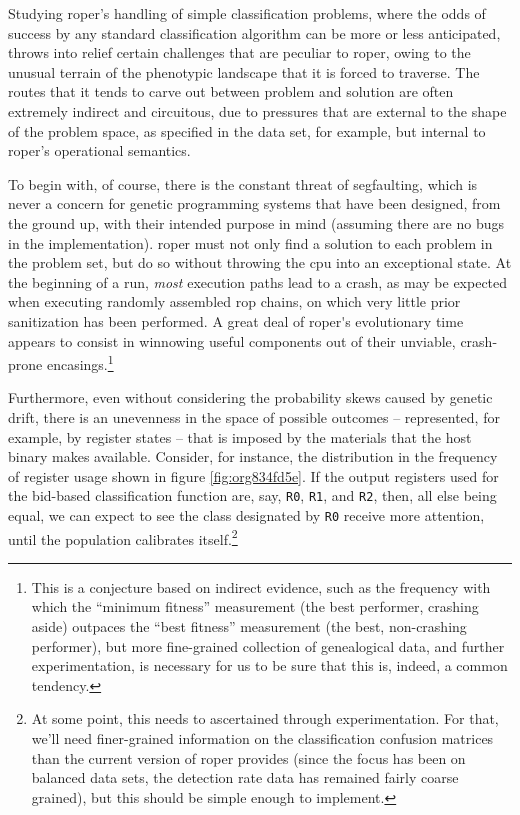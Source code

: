 \documentclass[12pt,glossary]{dalthesis}
\begin{document}
Studying \gls{roper}'s handling of simple classification problems, where the
odds of success by any standard classification algorithm can be more or less
anticipated, throws into relief certain challenges that are peculiar to \gls{roper},
owing to the unusual terrain of the phenotypic landscape that it is forced to
traverse. The routes that it tends to carve out between problem and solution
are often extremely indirect and circuitous, due to pressures that are external
to the shape of the problem space, as specified in the data set, for example, but
internal to \gls{roper}'s operational semantics.

To begin with, of course, there is the constant threat of segfaulting, which is
never a concern for genetic programming systems that have been designed, from the
ground up, with their intended purpose in mind (assuming there are no bugs in the
implementation). \Gls{roper} must not only find a solution to each problem in the
problem set, but do so without throwing the \gls{cpu} into an exceptional state. At
the beginning of a run, \emph{most} execution paths lead to a crash, as may be expected
when executing randomly assembled \gls{rop} chains, on which very little prior
sanitization has been performed. A great deal of \gls{roper's} evolutionary time
appears to consist in winnowing useful components out of their unviable, crash-prone
encasings.\footnote{This is a conjecture based on indirect evidence, such as the frequency with which
  the ``minimum fitness'' measurement (the best performer, crashing aside) outpaces
  the ``best fitness'' measurement (the best, non-crashing performer), but more
  fine-grained collection of genealogical data, and further experimentation, is
  necessary for us to be sure that this is, indeed, a common tendency.} 


Furthermore, even without considering the probability skews caused by genetic drift,
there is an unevenness in the space of possible outcomes -- represented, for example,
by register states -- that is imposed by the materials that the host binary makes
available. Consider, for instance, the distribution in the frequency of register
usage shown in figure \ref{fig:org834fd5e}. If the output registers
used for the bid-based classification function are, say, \texttt{R0}, \texttt{R1}, and \texttt{R2}, then,
all else being equal, we can expect to see the class designated by \texttt{R0} receive 
more attention, until the population calibrates itself.\footnote{At some point, this needs to ascertained through experimentation. For that, we'll
  need finer-grained information on the classification confusion matrices than the
  current version of \gls{roper} provides (since the focus has been on balanced data
  sets, the detection rate data has remained fairly coarse grained), but this should
  be simple enough to implement.}
\end{document}
